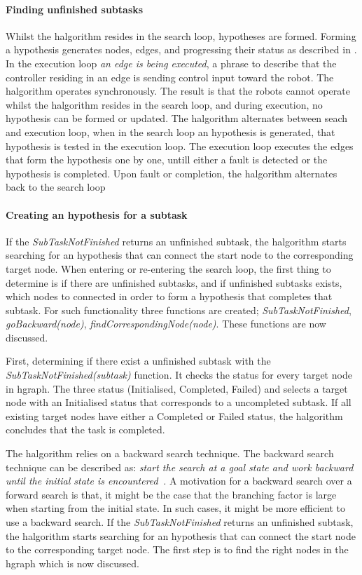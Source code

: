\paragraph{Finding unfinished subtasks}
Whilst the \ac{halgorithm} resides in the search loop, hypotheses are formed. Forming a hypothesis generates nodes, edges, and progressing their status as described in . In the execution loop \textit{an edge is being executed}, a phrase to describe that the controller residing in an edge is sending control input toward the robot. The \ac{halgorithm} operates synchronously. The result is that the robots cannot operate whilst the \ac{halgorithm} resides in the search loop, and during execution, no hypothesis can be formed or updated. The \ac{halgorithm} alternates between seach and execution loop, when in the search loop an hypothesis is generated, that hypothesis is tested in the execution loop. The execution loop executes the edges that form the hypothesis one by one, untill either a fault is detected or the hypothesis is completed. Upon fault or completion, the \ac{halgorithm} alternates back to the search loop\bs

\paragraph{Creating an hypothesis for a subtask}
If the \textit{SubTaskNotFinished} returns an unfinished subtask, the \ac{halgorithm} starts searching for an hypothesis that can connect the start node to the corresponding target node.
When entering or re-entering the search loop, the first thing to determine is if there are unfinished subtasks, and if unfinished subtasks exists, which nodes to connected in order to form a hypothesis that completes that subtask. For such functionality three functions are created; \textit{SubTaskNotFinished}, \textit{goBackward(\gls{node})}, \textit{findCorrespondingNode(\gls{node})}. These functions are now discussed.\bs

First, determining if there exist a unfinished subtask with the \textit{SubTaskNotFinished(\gls{subtask})} function. It checks the status for every target node in \ac{hgraph}. The three status (Initialised, Completed, Failed) and selects a target node with an Initialised status that corresponds to a uncompleted subtask. If all existing target nodes have either a Completed or Failed status, the \ac{halgorithm} concludes that the task is completed.\bs

 The \ac{halgorithm} relies on a backward search technique. The backward search technique can be described as: \textit{start the search at a goal state and work backward until the initial state is encountered~\cite{lavalle_planning_2006}.} A motivation for a backward search over a forward search is that, it might be the case that the branching factor is large when starting from the initial state. In such cases, it might be more efficient to use a backward search. If the \textit{SubTaskNotFinished} returns an unfinished subtask, the \ac{halgorithm} starts searching for an hypothesis that can connect the start node to the corresponding target node. The first step is to find the right nodes in the \ac{hgraph} which is now discussed.\bs


